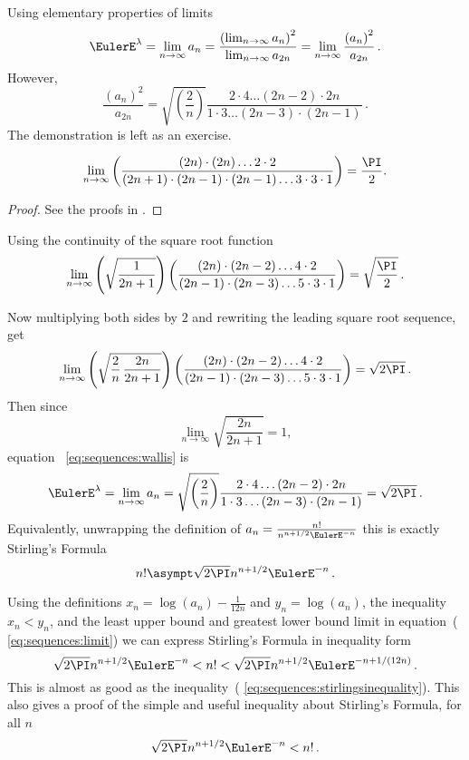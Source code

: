 \documentclass[12pt]{article}
\begin{document}
Using elementary properties of limits
\begin{equation}
    \EulerE^\lambda = \lim_{n \to \infty} a_{n} = \frac{\left(\lim_{n
    \to \infty} a_{n} \right)^2 }{\lim_{n \to \infty} a_{2n} } = \lim_{n
    \to \infty} \frac{\left(a_{n} \right)^2}{a_{2n}}\,.%
    \label{eq:sequences:limit}
\end{equation}
However,
\begin{equation}
    \frac{\left(a_{n} \right)^2}{a_{2n}} = \sqrt{\left(\frac{2}{n}
    \right) } \frac{2 \cdot 4 \dots (2n-2) \cdot 2n}{1 \cdot 3 \dots (2n-3)
    \cdot (2n-1)} \,.%
    \label{eq:sequences:wallis}
\end{equation}
The demonstration is left as an exercise.

\begin{lemma}
    \[
        \lim_{n \to \infty}\left(\frac{(2n)\cdot(2n)\dots 2 \cdot 2}{(2n+1)
        \cdot (2n-1) \cdot (2n-1) \dots 3 \cdot 3 \cdot 1} \right) =
        \frac{\PI}{2}.
    \]
\end{lemma}

\begin{proof}
    See the proofs in .
\end{proof}

Using the continuity of the square root function
\[
    \lim_{n \to \infty}\left(\sqrt{ \frac{1}{2n+1} } \right) \left(\frac
    {(2n)\cdot(2n-2)\dots 4 \cdot 2}{ (2n-1) \cdot (2n-3) \dots 5 \cdot
    3 \cdot 1} \right) = \sqrt{ \frac{\PI}{2} }\,.
\]

Now multiplying both sides by \( 2 \) and rewriting the leading square
root sequence, get
\[
    \lim_{n \to \infty}\left(\sqrt{ \frac{2}{n} \, \frac{2n}{2n+1} }
    \right) \left(\frac{(2n)\cdot(2n-2)\dots 4 \cdot 2}{ (2n-1) \cdot (2n-3)
    \dots 5 \cdot 3 \cdot 1} \right) = \sqrt{ 2 \PI }\,.
\] Then since
\[
    \lim_{n \to \infty} \sqrt{ \frac{2n}{2n+1} } = 1,
\] equation~%
\ref{eq:sequences:wallis} is
\[
    \EulerE^\lambda = \lim_{n \to \infty} a_{n} = \sqrt{ \left(\frac{2}{n}
    \right) } \frac{ 2 \cdot 4 \dots (2n-2) \cdot 2n }{ 1 \cdot 3 \dots
    (2n-3) \cdot (2n-1) } = \sqrt{ 2 \PI } \,.
\] Equivalently, unwrapping the definition of \( a_{n} = \frac{n!}{n^{n+1/2}\EulerE^
{-n}} \) this is exactly Stirling's Formula
\[
    n!  \asympt \sqrt{2 \PI} n^{n+1/2} \EulerE^{-n}\,.
\]

Using the definitions \( x_n = \log(a_{n} ) - \frac{1}{12n} \) and \( y_n
= \log(a_n) \), the inequality \( x_n < y_n \), and the least upper
bound and greatest lower bound limit in equation~(%
\ref{eq:sequences:limit}) we can express Stirling's Formula in
inequality form
\[
    \sqrt{2 \PI} n^{n+1/2} \EulerE^{-n} < n!  < \sqrt{2 \PI} n^{n+1/2}
    \EulerE^{-n + 1/(12n)}\,.
\] This is almost as good as the inequality~(%
\ref{eq:sequences:stirlingsinequality}).  This also gives a proof of the
simple and useful inequality about Stirling's Formula, for all \( n \)
\[
    \sqrt{2 \PI} n^{n+1/2} \EulerE^{-n} < n!\,.
\]
\end{document}
